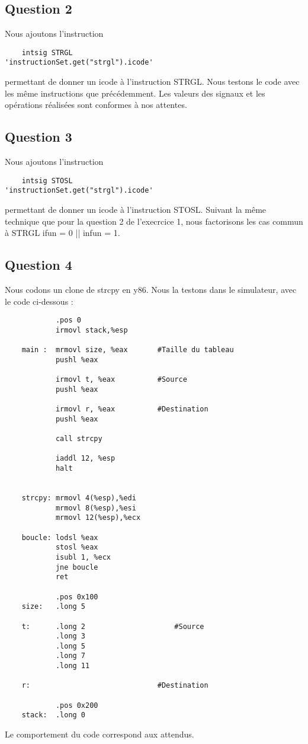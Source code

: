 \documentclass[a4paper,10pt]{article}
\begin{document}
\subsection{Question 2}
Nous ajoutons l'instruction
\begin{verbatim}
    intsig STRGL                     'instructionSet.get("strgl").icode'
\end{verbatim}
permettant de donner un icode à l'instruction STRGL.
Nous testons le code avec les même instructions que précédemment. Les valeurs des signaux et les opérations réalisées sont conformes à nos attentes.

\subsection{Question 3}
Nous ajoutons l'instruction
\begin{verbatim}
    intsig STOSL                     'instructionSet.get("strgl").icode'
\end{verbatim}
permettant de donner un icode à l'instruction STOSL.
Suivant la même technique que pour la question 2 de l'execrcice 1, nous factorisons les cas commun à STRGL ifun = 0 || infun = 1.

\subsection{Question 4}
Nous codons un clone de strcpy en y86. Nous la testons dans le simulateur, avec le code ci-dessous :
\begin{verbatim}
            .pos 0
            irmovl stack,%esp

    main :  mrmovl size, %eax       #Taille du tableau
            pushl %eax

            irmovl t, %eax          #Source
            pushl %eax

            irmovl r, %eax          #Destination
            pushl %eax

            call strcpy

            iaddl 12, %esp
            halt


    strcpy: mrmovl 4(%esp),%edi
            mrmovl 8(%esp),%esi
            mrmovl 12(%esp),%ecx

    boucle: lodsl %eax
            stosl %eax
            isubl 1, %ecx
            jne boucle
            ret

            .pos 0x100
    size:   .long 5

    t:      .long 2                     #Source
            .long 3
            .long 5
            .long 7
            .long 11

    r:                              #Destination

            .pos 0x200
    stack:  .long 0

\end{verbatim}
Le comportement du code correspond aux attendus.
\end{document}
